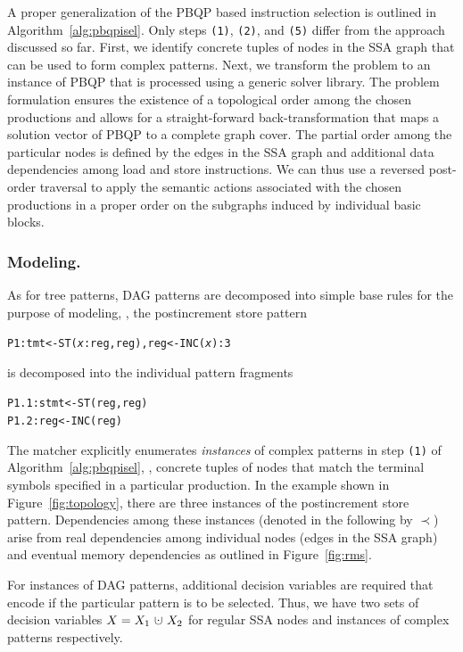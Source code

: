 A proper generalization of the PBQP based instruction selection
\cite{Ebner08} is outlined in Algorithm~\ref{alg:pbqpisel}. Only steps
\texttt{(1)}, \texttt{(2)}, and \texttt{(5)} differ from the approach
discussed so far. First, we identify concrete tuples of nodes in the
SSA graph that can be used to form complex patterns. Next, we
transform the problem to an instance of PBQP that is processed using a
generic solver library. The problem formulation ensures the existence
of a topological order among the chosen productions and allows for a
straight-forward back-transformation that maps a solution vector of
PBQP to a complete graph cover. The partial order among the particular
nodes is defined by the edges in the SSA graph and additional data
dependencies among load and store instructions.  We can thus use a
reversed post-order traversal to apply the semantic actions associated
with the chosen productions in a proper order on the subgraphs induced
by individual basic blocks.

\subsubsection{Modeling.}
As for tree patterns, DAG patterns are decomposed into simple base
rules for the purpose of modeling, \eg, the postincrement store
pattern
\begin{alltt}
  P1: tmt <- ST(\textit{x}:reg, reg), reg <- INC(\textit{x}) : 3
\end{alltt}
is decomposed into the individual pattern fragments
\begin{alltt}
  P1.1: stmt <- ST(reg, reg)
  P1.2: reg  <- INC(reg)
\end{alltt}
The matcher explicitly enumerates \emph{instances\/} of complex
patterns in step \texttt{(1)} of Algorithm~\ref{alg:pbqpisel}, \ie,
concrete tuples of nodes that match the terminal symbols specified in
a particular production. In the example shown in
Figure~\ref{fig:topology}, there are three instances of the
postincrement store pattern. Dependencies among these instances
(denoted in the following by $\prec$) arise from real dependencies
among individual nodes (edges in the SSA graph) and eventual memory
dependencies as outlined in Figure~\ref{fig:rms}.

For instances of DAG patterns, additional decision variables are
required that encode if the particular pattern is to be
selected. Thus, we have two sets of decision variables
$X=X_1~\dotcup~X_2$ for regular SSA nodes and instances of complex
patterns respectively.

